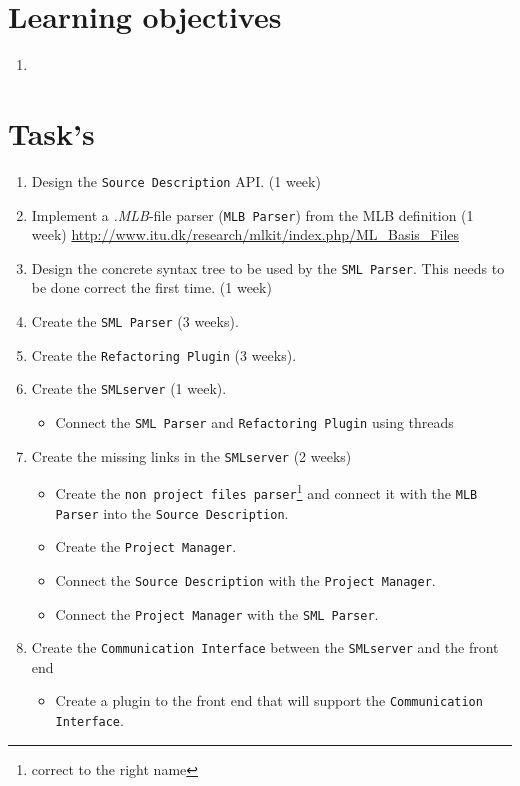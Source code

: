 \documentclass[a4paper,oneside]{memoir}
\begin{document}
\section{Learning objectives}

\begin{enumerate}
\item 
\end{enumerate}

\section{Task's}

\begin{enumerate}
\item Design the \texttt{Source Description} API. (1 week)

\item Implement a \textit{.MLB}-file parser (\texttt{MLB Parser}) from the MLB
  definition (1 week) 
\url{http://www.itu.dk/research/mlkit/index.php/ML_Basis_Files}

\item Design the concrete syntax tree to be used by the \texttt{SML
    Parser}. This needs to be done correct the first time. (1 week)

\item Create the \texttt{SML Parser} (3 weeks).

\item Create the \texttt{Refactoring Plugin} (3 weeks).

\item Create the \texttt{SMLserver} (1 week).
  \begin{itemize}
  \item Connect the \texttt{SML Parser} and \texttt{Refactoring Plugin} using threads
  \end{itemize}

\item Create the missing links in the \texttt{SMLserver} (2 weeks)
  \begin{itemize}
  \item Create the \texttt{non project files parser}\footnote{correct to the
      right name} and connect it with the \texttt{MLB Parser} into the
    \texttt{Source Description}.

  \item Create the \texttt{Project Manager}.

  \item Connect the \texttt{Source Description} with the \texttt{Project
      Manager}.

  \item Connect the \texttt{Project Manager} with the \texttt{SML Parser}.
  \end{itemize}

\item Create the \texttt{Communication Interface} between the \texttt{SMLserver}
  and the front end
  \begin{itemize}
  \item Create a plugin to the front end that will support the
    \texttt{Communication Interface}.
  \end{itemize}
\end{enumerate}
\end{document}
